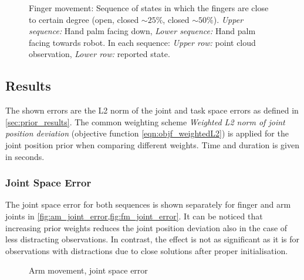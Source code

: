 \begin{figure}
\begin{tabular}{c:c:c}
\end{tabular}
\caption{Finger movement: Sequence of states in which the fingers are close to certain degree (open, closed $\sim 25\%$, closed $\sim 50\%$). \textit{Upper sequence:} Hand palm facing down, \textit{Lower sequence:} Hand palm facing towards robot. In each sequence: \textit{Upper row:} point cloud observation, \textit{Lower row:} reported state.}
\label{fig:finger_movement_states}
\end{figure}


\subsection{Results}

The shown errors are the L2 norm of the joint and task space errors as defined in \cref{sec:prior_results}. The common weighting scheme \emph{Weighted L2 norm of joint position deviation} (objective function \cref{eqn:objf_weightedL2}) is applied for the joint position prior when comparing different weights. Time and duration is given in seconds.

\subsubsection{Joint Space Error}

The joint space error for both sequences is shown separately for finger and arm joints in \cref{fig:am_joint_error,fig:fm_joint_error}. It can be noticed that increasing prior weights reduces the joint position deviation also in the case of less distracting observations. In contrast, the effect is not as significant as it is for observations with distractions due to close solutions after proper initialisation.

\begin{figure}
\centering
{}
\caption{Arm movement, joint space error}
\label{fig:am_joint_error}
\end{figure}

